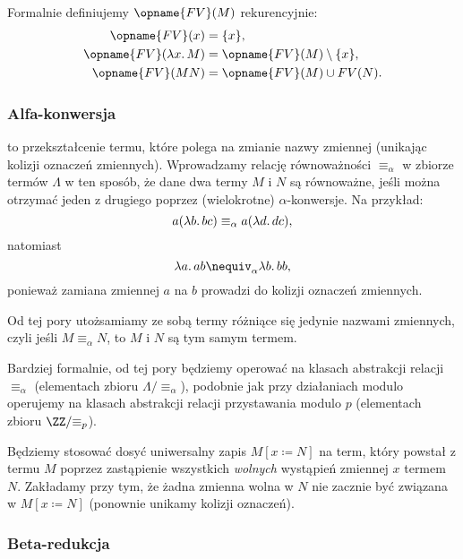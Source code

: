 \documentclass[polish,pretty]{angav}
\newcommand{\FV}{\opname{FV}}
\begin{document}
\begin{remark}
    Formalnie definiujemy $\FV(M)$ rekurencyjnie:
    \begin{align*}
        \FV(x) &= \{x\}, \\
        \FV(\lambda x\ldotp M) &= \FV(M) \setminus \{x\}, \\
        \FV(MN) &= \FV(M) \cup FV(N).
    \end{align*}
\end{remark}

\subsubsection{Alfa-konwersja}

 to przekształcenie termu, które polega na zmianie nazwy zmiennej (unikając kolizji oznaczeń zmiennych). Wprowadzamy relację równoważności $\equiv_\alpha$ w zbiorze termów $\Lambda$ w ten sposób, że dane dwa termy $M$ i $N$ są równoważne, jeśli można otrzymać jeden z drugiego poprzez (wielokrotne) $\alpha$-konwersje. Na przykład:
\[ a (\lambda b\ldotp bc) \equiv_\alpha a (\lambda d\ldotp dc), \]
natomiast
\[ \lambda a\ldotp ab \nequiv_\alpha \lambda b\ldotp bb, \]
ponieważ zamiana zmiennej $a$ na $b$ prowadzi do kolizji oznaczeń zmiennych.

Od tej pory utożsamiamy ze sobą termy różniące się jedynie nazwami zmiennych, czyli jeśli $M \equiv_\alpha N$, to $M$ i $N$ są tym samym termem.

\begin{remark}
    Bardziej formalnie, od tej pory będziemy operować na klasach abstrakcji relacji $\equiv_\alpha$ (elementach zbioru $\Lambda/{\equiv_\alpha}$), podobnie jak przy działaniach modulo operujemy na klasach abstrakcji relacji przystawania modulo $p$ (elementach zbioru $\ZZ/{\equiv_p}$).
\end{remark}

Będziemy stosować dosyć uniwersalny zapis $M[x \coloneqq N]$ na term, który powstał z termu $M$ poprzez zastąpienie wszystkich \emph{wolnych} wystąpień zmiennej $x$ termem $N$.
Zakładamy przy tym, że żadna zmienna wolna w $N$ nie zacznie być związana w $M[x \coloneqq N]$ (ponownie unikamy kolizji oznaczeń).

\subsubsection{Beta-redukcja}
\end{document}
